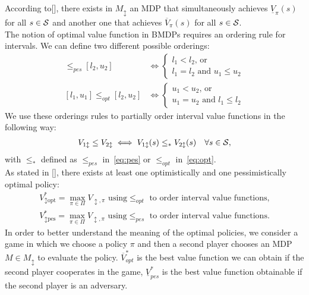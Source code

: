 According to[\cite{givan2000bounded}], there exists in $M_{\updownarrow}$ an \ac{MDP} that simultaneously achieves $\underline{V}_{\pi}(s)$ for all $s \in \mathcal{S}$ and another one that achieves $\overline{V}_{\pi}(s)$ for all $s \in \mathcal{S}$.\\
\newline
The notion of optimal value function in \ac{BMDP}s requires an ordering rule for intervals. We can define two different possible orderings:
\begin{align}
[l_1, u_1] \leq_{pes} [l_2, u_2] &\Leftrightarrow 
\begin{cases}
l_1 < l_2 \text{, or }\\
l_1 = l_2 \text{ and } u_1 \leq u_2
\end{cases} \label{eq:pes}\\
[l_1, u_1] \leq_{opt} [l_2, u_2] &\Leftrightarrow 
\begin{cases}
u_1 < u_2 \text{, or }\\
u_1 = u_2 \text{ and } l_1 \leq l_2
\end{cases} \label{eq:opt}
\end{align}
We use these orderings rules to partially order interval value functions in the following way:
\begin{align} V_{1 \updownarrow} \leq V_{2 \updownarrow} \iff V_{1 \updownarrow}(s) \leq_{*} V_{2 \updownarrow}(s) \quad \forall s \in \mathcal{S}, \end{align}
with $\leq_{*}$ defined as $\leq_{pes}$ in~\eqref{eq:pes} or $\leq_{opt}$ in~\eqref{eq:opt}.\\
\newline
As stated in [\cite{givan2000bounded}], there exists at least one optimistically and one pessimistically optimal policy:
\begin{align*}
V^{*}_{\updownarrow \text{opt}} = \max_{\pi \in \Pi} V_{\updownarrow, \pi} \text{ using} \leq_{opt} \text{ to order interval value functions,}\\
V^{*}_{\updownarrow \text{pes}} = \max_{\pi \in \Pi} V_{\updownarrow, \pi} \text{ using} \leq_{pes} \text{ to order interval value functions.}
\end{align*}
In order to better understand the meaning of the optimal policies, we consider a game in which we choose a policy $\pi$ and then a second player chooses an \ac{MDP} $M \in M_{\updownarrow}$ to evaluate the policy. $\overline{V}^{*}_{opt}$ is the best value function we can obtain if the second player cooperates in the game, $\underline{V}^{*}_{pes}$ is the best value function obtainable if the second player is an adversary.\\
